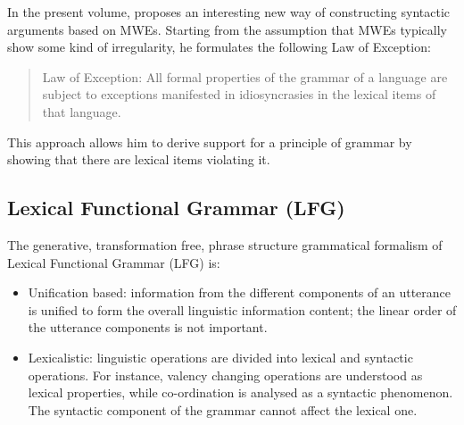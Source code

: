 \documentclass[output=paper]{langsci/langscibook}
\begin{document}
In the present volume, \citeauthor{Kuiper2018tv} proposes an interesting new way of constructing syntactic arguments based on MWEs. Starting from the assumption that MWEs typically show some kind of irregularity, he formulates the following Law of Exception:

\begin{quote}
Law of Exception: All formal properties of the grammar of a language are subject to exceptions manifested in idiosyncrasies in the lexical items of that language.
\end{quote}

This approach allows him to derive support for a principle of grammar by showing that there are lexical items violating it. 


\subsection{Lexical Functional Grammar (LFG)}
\label{Sec-LFG}


The generative, transformation free, phrase structure grammatical formalism of Lexical Functional Grammar (LFG) is:
\begin{itemize}
\item Unification based: information from the different components of an utterance is unified to form the overall linguistic information content; the linear order of the utterance components is not important.
\item Lexicalistic: linguistic operations are divided into lexical and syntactic operations. For instance, valency changing operations are understood as lexical properties, while co-ordination is analysed as a syntactic phenomenon. The syntactic component of the grammar cannot affect the lexical one.
\end{itemize}
\end{document}
